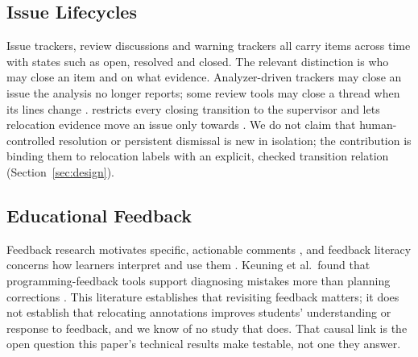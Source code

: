 \subsection{Issue Lifecycles}
Issue trackers, review discussions and warning trackers all carry items across time with states such as open, resolved and closed. The relevant distinction is who may close an item and on what evidence. Analyzer-driven trackers may close an issue the analysis no longer reports; some review tools may close a thread when its lines change \cite{gitlabautoresolve}. \sys{} restricts every closing transition to the supervisor and lets relocation evidence move an issue only towards . We do not claim that human-controlled resolution or persistent dismissal is new in isolation; the contribution is binding them to relocation labels with an explicit, checked transition relation (Section~\ref{sec:design}).

\subsection{Educational Feedback}
Feedback research motivates specific, actionable comments \cite{hattie2007power,shute2008focus}, and feedback literacy concerns how learners interpret and use them \cite{carless2018feedback,winstone2017supporting}. Keuning et al.\ found that programming-feedback tools support diagnosing mistakes more than planning corrections \cite{keuning2018systematic}. This literature establishes that revisiting feedback matters; it does not establish that relocating annotations improves students' understanding or response to feedback, and we know of no study that does. That causal link is the open question this paper's technical results make testable, not one they answer.
